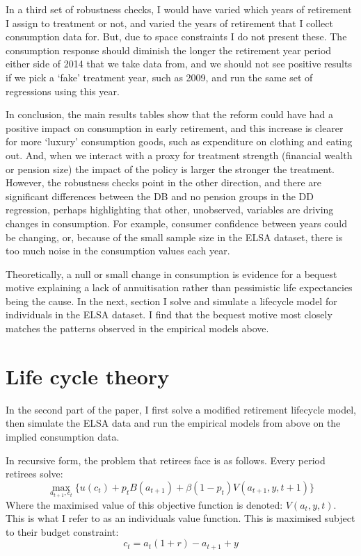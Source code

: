 \documentclass[12pt]{article}
\begin{document}
In a third set of robustness checks, I would have varied which years of
retirement I assign to treatment or not, and varied the years of retirement that
I collect consumption data for. But, due to space constraints I do not present
these. The consumption response should diminish the longer the retirement year
period either side of 2014 that we take data from, and we should not see
positive results if we pick a `fake' treatment year, such as 2009, and run the
same set of regressions using this year.

In conclusion, the main results tables show that the reform could have had a
positive impact on consumption in early retirement, and this increase is clearer
for more `luxury' consumption goods, such as expenditure on clothing and eating
out. And, when we interact with a proxy for treatment strength (financial wealth
or pension size) the impact of the policy is larger the stronger the treatment.
However, the robustness checks point in the other direction, and there are
significant differences between the DB and no pension groups in the DD
regression, perhaps highlighting that other, unobserved, variables are driving
changes in consumption. For example, consumer confidence between years could be
changing, or, because of the small sample size in the ELSA dataset, there is too
much noise in the consumption values each year.

Theoretically, a null or small change in consumption is evidence for a
bequest motive explaining a lack of annuitisation rather than pessimistic life
expectancies being the cause. In the next, section I solve and simulate a
lifecycle model for individuals in the ELSA dataset. I find that the bequest
motive most closely matches the patterns observed in the empirical models above.

\section{Life cycle theory}

In the second part of the paper, I first solve a modified retirement lifecycle
model, then simulate the ELSA data and run the empirical models from
above on the implied consumption data.

In recursive form, the problem that retirees face is as follows. Every period
retirees solve:
\begin{equation*}
    \underset{a_{t+1}, c_{t}}{\max} \{ u(c_{t}) + p_{t}B(a_{t+1}) + \beta(1-p_{t})V(a_{t+1}, y, t+1) \}
\end{equation*}
Where the maximised value of this objective function is denoted: $V(a_{t}, y,
    t)$. This is what I refer to as an individuals value function.
This is maximised subject to their budget constraint:
\begin{equation*}
    c_{t} =a_{t}(1 +r) -  a_{t+1} + y
\end{equation*}
\end{document}

